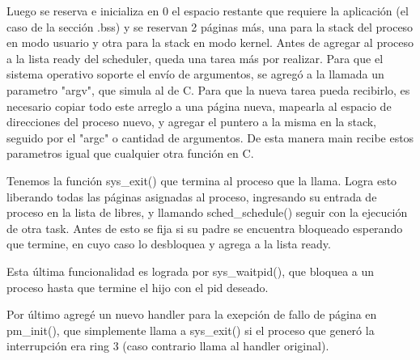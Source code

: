 Luego se reserva e inicializa en 0 el espacio restante que requiere la
aplicación (el caso de la sección .bss) y se reservan 2 páginas más, una para
la stack del proceso en modo usuario y otra para la stack en modo kernel. Antes
de agregar al proceso a la lista ready del scheduler, queda una tarea más por
realizar. Para que el sistema operativo soporte el envío de argumentos, se
agregó a la llamada un parametro "argv", que simula al de C. Para que la nueva
tarea pueda recibirlo, es necesario copiar todo este arreglo a una página
nueva, mapearla al espacio de direcciones del proceso nuevo, y agregar el
puntero a la misma en la stack, seguido por el "argc" o cantidad de argumentos.
De esta manera main recibe estos parametros igual que cualquier otra función en
C.

Tenemos la función sys\_exit() que termina al proceso que la llama. Logra esto
liberando todas las páginas asignadas al proceso, ingresando su entrada de
proceso en la lista de libres, y llamando sched\_schedule() seguir con la
ejecución de otra task. Antes de esto se fija si su padre se encuentra
bloqueado esperando que termine, en cuyo caso lo desbloquea y agrega a la lista
ready.

Esta última funcionalidad es lograda por sys\_waitpid(), que bloquea a un
proceso hasta que termine el hijo con el pid deseado.

Por último agregé un nuevo handler para la exepción de fallo de página en
pm\_init(), que simplemente llama a sys\_exit() si el proceso que generó la
interrupción era ring 3 (caso contrario llama al handler original).
